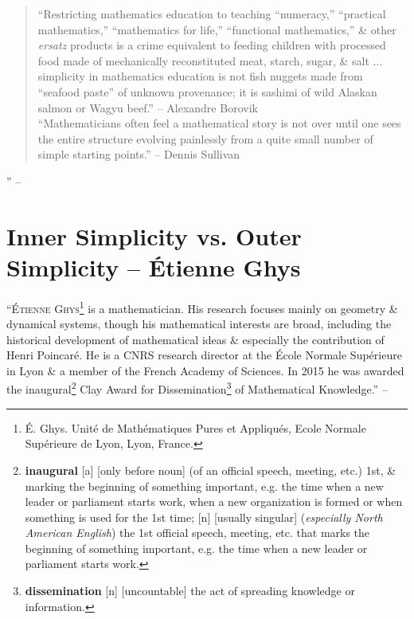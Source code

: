\documentclass[oneside]{book}
\numberwithin{equation}{section}
\begin{document}
\begin{quotation}
	``Restricting mathematics education to teaching ``numeracy,'' ``practical mathematics,'' ``mathematics for life,'' ``functional mathematics,'' \& other \textit{ersatz} products is a crime equivalent to feeding children with processed food made of mechanically reconstituted meat,  starch, sugar, \& salt $\ldots$ simplicity in mathematics education is not fish nuggets made from ``seafood paste'' of unknown provenance; it is sashimi of wild Alaskan salmon or Wagyu beef.'' -- Alexandre Borovik\\
	
	``Mathematicians often feel a mathematical story is not over until one sees the entire structure evolving painlessly from a quite small number of simple starting points.'' -- Dennis Sullivan
\end{quotation}
'' -- \cite[Preface, pp. vii--xii]{Kossak_Ording2017}

\section{Inner Simplicity vs. Outer Simplicity -- \'Etienne Ghys}
``\textsc{\'Etienne Ghys}\footnote{\'E. Ghys. Unit\'e de Math\'ematiques Pures et Appliqu\'es, Ecole Normale Sup\'erieure de Lyon, Lyon, France.} is a mathematician. His research focuses mainly on geometry \& dynamical systems, though his mathematical interests are broad, including the historical development of mathematical ideas \& especially the contribution of Henri Poincar\'e. He is a CNRS research director at the \'Ecole Normale Sup\'erieure in Lyon \& a member of the French Academy of Sciences. In 2015 he was awarded the inaugural\footnote{\textbf{inaugural} [a] [only before noun] (of an official speech, meeting, etc.) 1st, \& marking the beginning of something important, e.g. the time when a new leader or parliament starts work, when a new organization is formed or when something is used for the 1st time; [n] [usually singular] (\textit{especially North American English}) the 1st official speech, meeting, etc. that marks the beginning of something important, e.g. the time when a new leader or parliament starts work.} Clay Award for Dissemination\footnote{\textbf{dissemination} [n] [uncountable] the act of spreading knowledge or information.} of Mathematical Knowledge.'' -- \cite[Contributors, p. xviii]{Kossak_Ording2017}
\end{document}
